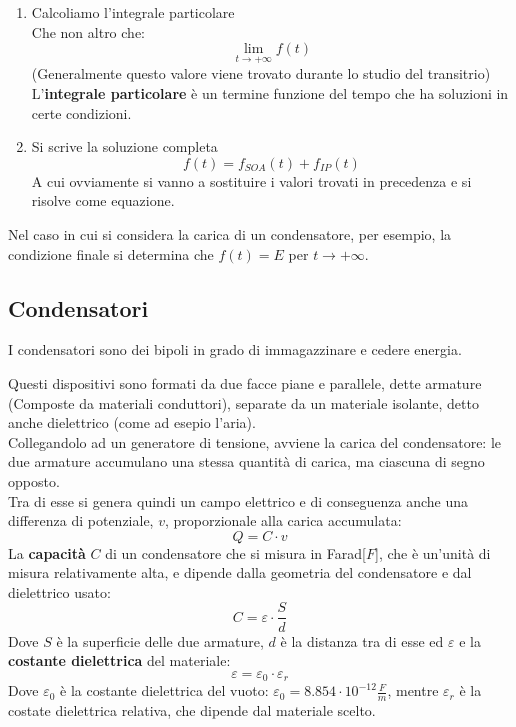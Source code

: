 \documentclass[../main.tex]{subfiles}
\begin{document}
\begin{enumerate}
		\item Calcoliamo l'integrale particolare\\
		Che non altro che: 
		\begin{equation}
			\lim\limits_{t \to +\infty} f(t)
		\end{equation}  
		(Generalmente questo valore viene trovato durante lo studio del transitrio) \\
		L'\textbf{integrale particolare} è un termine funzione del tempo che ha soluzioni in certe condizioni.
		\item Si scrive la soluzione completa
		\begin{equation}
			f(t)=f_{SOA}(t)+f_{IP}(t)	
		\end{equation}
		A cui ovviamente si vanno a sostituire i valori trovati in precedenza e si risolve come equazione.
	\end{enumerate}
	Nel caso in cui si considera la carica di un condensatore, per esempio, la condizione finale si determina che $f(t)=E$ per $t\rightarrow +\infty$.
	\subsection{Condensatori}
	\begin{definition}
		I condensatori sono dei bipoli in grado di immagazzinare e cedere energia.
	\end{definition}
	Questi dispositivi sono formati da due facce piane e parallele, dette armature (Composte da materiali conduttori), separate da un materiale isolante, detto anche dielettrico (come ad esepio l'aria).\\
	Collegandolo ad un generatore di tensione, avviene la carica del condensatore: le due armature accumulano una stessa quantità di carica, ma ciascuna di segno opposto.\\
	Tra di esse si genera quindi un campo elettrico e di conseguenza anche una differenza di potenziale, $v$, proporzionale alla carica accumulata:
	\[Q = C \cdot v\]
	La \textbf{capacità} $C$ di un condensatore che si misura in Farad[$F$], che è un’unità di misura relativamente alta, e dipende dalla geometria del condensatore e dal dielettrico usato:
	\[C = \varepsilon \cdot \frac{S}{d}\]
	Dove $S$ è la superficie delle due armature, $d$ è la distanza tra di esse ed $\varepsilon$ e la \textbf{costante dielettrica} del materiale:
	\[\varepsilon = \varepsilon_0 \cdot \varepsilon_r\]
	Dove $\varepsilon_0$ è la costante dielettrica del vuoto:  $\varepsilon_0 = 8.854 \cdot 10^{-12} \frac{F}{m}$, mentre $\varepsilon_r$ è la costate dielettrica relativa, che dipende dal materiale scelto.
\end{document}
